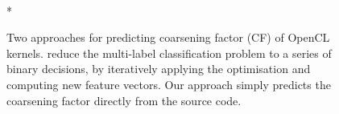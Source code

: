 \begin{figure}
  \centering %
  \\*%
  \caption[Predicting OpenCL thread coarsening factors.]{%
      Two approaches for predicting coarsening factor (CF) of OpenCL kernels.
      \citeauthor{Magni2014}reduce the multi-label classification problem to a
      series of binary decisions, by iteratively applying the optimisation and
      computing new feature vectors. Our approach simply predicts the coarsening
      factor directly from the source code.%
  }
  \label{fig:cascading-nn}
\end{figure}
